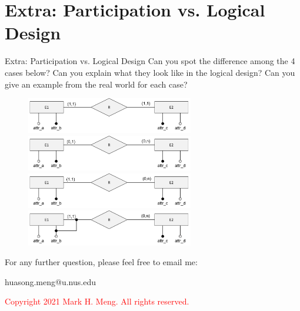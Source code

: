 \section*{Extra: Participation vs. Logical Design}
\begin{frame}[fragile]{Extra: Participation vs. Logical Design}
Can you spot the difference among the 4 cases below? Can you explain what they look like in the logical design? Can you give an example from the real world for each case?\\ \vspace{4pt}
	
\begin{figure}
	\includegraphics[width=0.65\textwidth, trim=0 0 0 0, clip]{t4/images/case1.png}
	\includegraphics[width=0.65\textwidth, trim=0 0 0 0, clip]{t4/images/case2.png}
	\includegraphics[width=0.65\textwidth, trim=0 0 0 0, clip]{t4/images/case3.png}
	\includegraphics[width=0.65\textwidth, trim=0 0 0 0, clip]{t4/images/case4.png}
\end{figure}
\end{frame}
	
\begin{frame}{}
	\centering  
	For any further question, please feel free to email me:\vspace{10pt}
	
	huasong.meng@u.nus.edu \vspace{20pt}
	
	\begin{tcolorbox}
		\begin{center}
			\textcolor{red}{Copyright 2021 Mark H. Meng. All rights reserved.}
		\end{center}
	\end{tcolorbox}
\end{frame}